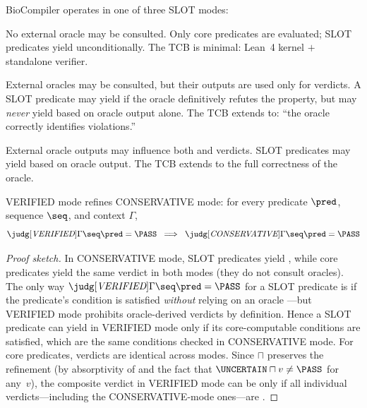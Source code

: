\begin{definition}
\label{def:slot-modes}
BioCompiler operates in one of three SLOT modes:
\begin{description}[leftmargin=!,labelwidth=2.2cm,itemsep=1pt,topsep=1pt]
\item[CONSERVATIVE] No external oracle may be consulted.
      Only core predicates are evaluated; SLOT predicates yield
      \UNCERTAIN{} unconditionally.
      The TCB is minimal: Lean~4 kernel $+$ standalone verifier.

\item[VERIFIED] External oracles may be consulted, but their outputs
      are used only for \FAIL{} verdicts.
      A SLOT predicate may yield \FAIL{} if the oracle definitively
      refutes the property, but may \emph{never} yield \PASS{} based
      on oracle output alone.
      The TCB extends to: ``the oracle correctly identifies
      violations.''

\item[PERMISSIVE] External oracle outputs may influence both \PASS{}
      and \FAIL{} verdicts.
      SLOT predicates may yield \PASS{} based on oracle output.
      The TCB extends to the full correctness of the oracle.
\end{description}
\end{definition}

\begin{theorem}\label{thm:refinement}
VERIFIED mode refines CONSERVATIVE mode: for every predicate $\pred$,
sequence $\seq$, and context $\Gamma$,
\[
  \judg[\textit{VERIFIED}]{\Gamma}{\seq}{\pred} = \PASS
  \;\;\Longrightarrow\;\;
  \judg[\textit{CONSERVATIVE}]{\Gamma}{\seq}{\pred} = \PASS
\]
\end{theorem}

\begin{proof}[Proof sketch]
In CONSERVATIVE mode, SLOT predicates yield \UNCERTAIN{}, while core
predicates yield the same verdict in both modes (they do not consult
oracles).
The only way $\judg[\textit{VERIFIED}]{\Gamma}{\seq}{\pred} = \PASS$
for a SLOT predicate is if the predicate's condition is satisfied
\emph{without} relying on an oracle \PASS---but VERIFIED mode
prohibits oracle-derived \PASS{} verdicts by definition.
Hence a SLOT predicate can yield \PASS{} in VERIFIED mode only if
its core-computable conditions are satisfied, which are the same
conditions checked in CONSERVATIVE mode.
For core predicates, verdicts are identical across modes.
Since $\sqcap$ preserves the refinement (by absorptivity of \FAIL{}
and the fact that $\UNCERTAIN \sqcap v \neq \PASS$ for any~$v$), the
composite verdict in VERIFIED mode can be \PASS{} only if all
individual verdicts---including the CONSERVATIVE-mode ones---are
\PASS.
\end{proof}

